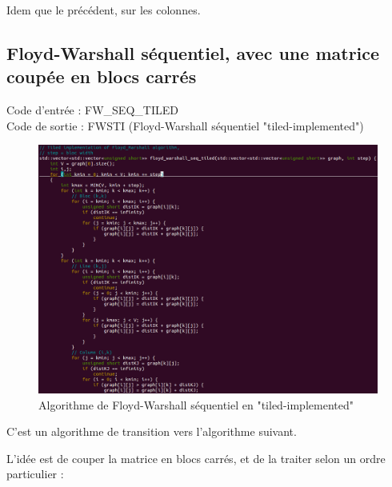 \documentclass[a4paper,11pt]{article}
\begin{document}
Idem que le précédent, sur les colonnes.

\subsection{Floyd-Warshall séquentiel, avec une matrice coupée en blocs carrés}

\noindent Code d'entrée : FW\_SEQ\_TILED \\
Code de sortie : FWSTI (Floyd-Warshall séquentiel "tiled-implemented")

\begin{figure}[H]
\begin{center}
  \includegraphics[scale=0.6]{FW_SEQ_TILED.png}
  \caption{Algorithme de Floyd-Warshall séquentiel en "tiled-implemented"}
\end{center}
\end{figure}

C'est un algorithme de transition vers l'algorithme suivant.

L'idée est de couper la matrice en blocs carrés, et de la traiter selon un ordre particulier :
\end{document}
